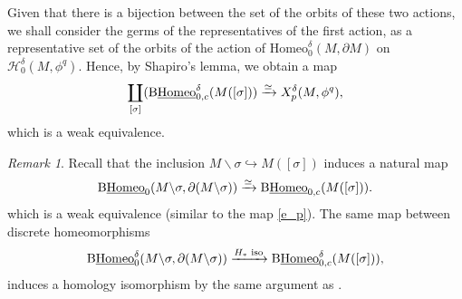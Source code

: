 \documentclass[a4paper]{amsart}
\theoremstyle{definition}
\theoremstyle{remark}
\newtheorem{rem}[thm]{Remark}
\newcommand{\tH}{\text{\textnormal{Homeo}}}
\newcommand{\BwH}{\mathrm{B}\underline{\text{\textnormal{Homeo}}}}
\newcommand{\tdH}{\text{Homeo}^{\delta}}
\newcommand{\BdwH}{\mathrm{B}\underline{\text{\textnormal{Homeo}}}^{\delta}}
\numberwithin{equation}{section}
\begin{document}
\begin{itemize}[leftmargin=*]

Given that there is a bijection between the set of the orbits of these two actions, we shall consider the germs of the representatives of the first action, as a representative set of the orbits of the action of $\tdH_0(M,\partial M)$ on $\mathcal{H}^{\delta}_{0}(M,\phi^q)$. Hence, by Shapiro's lemma, we obtain a map
\[
 \coprod_{[\sigma]} (\BdwH_{0,c}(M([\sigma]))\xrightarrow{\simeq} X^{\delta}_{p}(M,\phi^q),
\]
which is a weak equivalence. 
\end{itemize}
\begin{rem}Recall that the inclusion $M\backslash \sigma\hookrightarrow M([\sigma])$ induces a natural map
\[
\BwH_0(M\backslash \sigma, \partial(M\backslash \sigma))\xrightarrow{\simeq} \BwH_{0,c}(M([\sigma])).
\]
which is a weak equivalence (similar to the map \ref{e_p}). The same map between discrete homeomorphisms
\[
\BdwH_0(M\backslash \sigma, \partial(M\backslash \sigma))\xrightarrow{H_*\text{ iso}} \BdwH_{0,c}(M([\sigma])),
\]
induces a homology isomorphism by the same argument as \cite[Corollary 2.3]{nariman2014homologicalstability}.
\end{rem}
\end{document}
